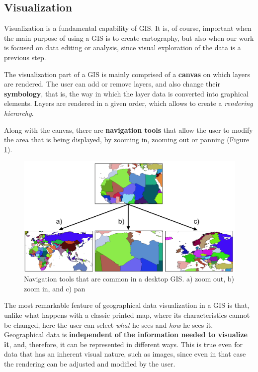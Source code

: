 \subsection{Visualization}

Visualization is a fundamental capability of GIS. It is, of course, important when the main purpose of using a GIS is to create cartography, but also when our work is focused on data editing or analysis, since visual exploration of the data is a previous step.

The visualization part of a GIS is mainly comprised of a \textbf{canvas} on which layers are rendered. The user can add or remove layers, and also change their \textbf{symbology}, that is, the way in which the layer data is converted into graphical elements. Layers are rendered in a given order, which allows to create a \emph{rendering hierarchy}.

Along with the canvas, there are \textbf{navigation tools} that allow the user to modify the area that is being displayed, by zooming in, zooming out or panning (Figure \ref{Fig:Navigation_tools}). 

\begin{figure}[!hbt]
\centering
\includegraphics[width=.99\textwidth]{Software/Navigation_tools.png}

\caption{\small Navigation tools that are common in a desktop GIS. a) zoom out, b) zoom in, and c) pan}
\label{Fig:Navigation_tools} 
\end{figure}

The most remarkable feature of geographical data visualization in a GIS is that, unlike what happens with a classic printed map, where its characteristics cannot be changed, here the user can select \emph{what} he sees and \emph{how} he sees it. Geographical data is \textbf{independent of the information needed to visualize it}, and, therefore, it can be represented in different ways. This is true even for data that has an inherent visual nature, such as images, since even in that case the rendering can be adjusted and modified by the user.

